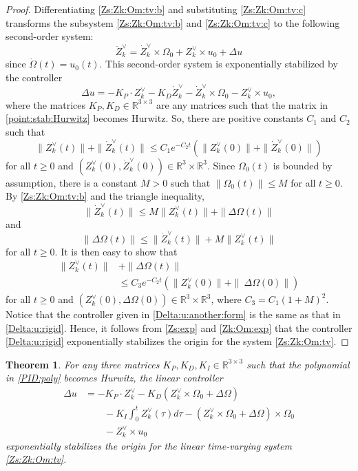 \documentclass[letterpaper, 10 pt, conference]{ieeeconf}  %
\newtheorem{theorem}{Theorem}[section]
\begin{document}
\begin{proof}
Differentiating \eqref{Zs:Zk:Om:tv:b} and substituting \eqref{Zs:Zk:Om:tv:c}  transforms the subsystem \eqref{Zs:Zk:Om:tv:b} and \eqref{Zs:Zk:Om:tv:c} to the following second-order system:
\[
\ddot Z_k^\vee = \dot Z_k^\vee \times \Omega_0 +Z _k^\vee \times u_0 + \Delta u
\]
since $\dot \Omega (t) = u_0(t)$. This second-order system
 is exponentially stabilized by the controller
\begin{equation}\label{Delta:u:another:form}
\Delta u = -K_P \cdot Z_k^\vee - K_D \dot Z_k^\vee -  \dot Z_k^\vee \times \Omega_0 - Z_k^\vee \times u_0,
\end{equation}
where the matrices $K_P, K_D \in \mathbb R^{3\times 3}$ are any matrices such that the matrix in \eqref{point:stab:Hurwitz} becomes Hurwitz. So, there are positive constants $C_1$ and $C_2$ such that 
\[
\|Z_k^\vee (t)\| + \|\dot Z_k^\vee (t)\| \leq C_1e^{-C_2t} (\|Z_k^\vee (0)\| + \|\dot Z_k^\vee (0)\| )
\]
for all $t\geq 0$ and $(Z_k^\vee (0), \dot Z_k^\vee (0)) \in \mathbb R^{3} \times  \mathbb R^{3}$.
Since $\Omega_0(t)$ is bounded by assumption, there is a constant $M>0$ such that $ \|\Omega_0(t)\| \leq M$ for all $t\geq0$. By  \eqref{Zs:Zk:Om:tv:b} and the triangle inequality,
\[
\|\dot Z_k^\vee (t) \| \leq   M\|Z_k^\vee (t)\| + \| \Delta \Omega (t)\|
\]
and
\[
 \|\Delta \Omega (t)\| \leq \| \dot Z_k^\vee (t)\| + M \|Z_k^\vee (t)\| 
\]
for all $t\geq 0$. It is then easy to show that
\begin{align}
\|Z_k^\vee (t)\| &+ \|\Delta \Omega (t)\| \nonumber \\
&\leq C_3e^{-C_2t}(\|Z_k^\vee (0)\| + \|\ \Delta \Omega (0)\|)  \label{Zk:Om:exp}
\end{align}
for all $t\geq 0$ and $(Z_k^\vee (0), \Delta \Omega (0))\in \mathbb R^{3} \times  \mathbb R^{3}$, where $C_3 = C_1(1+M)^2$. Notice that the controller given in \eqref{Delta:u:another:form} is the same as that in \eqref{Delta:u:rigid}. Hence,  it follows  
from \eqref{Zs:exp} and \eqref{Zk:Om:exp} that the controller  \eqref{Delta:u:rigid} exponentially stabilizes the origin for the system \eqref{Zs:Zk:Om:tv}. 
\end{proof}

\begin{theorem}\label{theorem:delta:2}
For any three matrices $K_P, K_D, K_I \in \mathbb R^{3\times 3}$ such that the polynomial in \eqref{PID:poly} becomes Hurwitz,  the linear controller
\begin{align}
\Delta u &= -K_P \cdot Z_k^\vee - K_D (Z_k^\vee \times \Omega_0 + \Delta \Omega )  \nonumber \\
&\quad\quad - K_I\int_0^t   Z_k^\vee (\tau) d\tau  - (Z_k^\vee \times \Omega_0 + \Delta \Omega )\times \Omega_0 \nonumber \\
&\quad\quad- Z_k^\vee \times u_0 \label{Delta:u:rigid:PID}
\end{align}
exponentially stabilizes the origin for the linear time-varying system \eqref{Zs:Zk:Om:tv}. 
\end{theorem}
\end{document}
